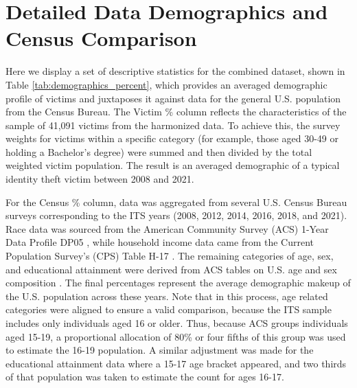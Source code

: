 \clearpage
\appendix




\section{Detailed Data Demographics and Census Comparison}
\label{app:demographics_census}

Here we display a set of descriptive statistics for the combined dataset,  shown in Table \ref{tab:demographics_percent}, which provides an averaged demographic profile of victims and juxtaposes it against data for the general U.S. population from the Census Bureau. The Victim \% column reflects the characteristics of the sample of 41,091 victims from the harmonized data. To achieve this, the survey weights for victims within a specific category (for example, those aged 30-49 or holding a Bachelor's degree) were summed and then divided by the total weighted victim population. The result is an averaged demographic of a typical identity theft victim between 2008 and 2021. 

For the Census \% column, data was aggregated from several U.S. Census Bureau surveys corresponding to the ITS years (2008, 2012, 2014, 2016, 2018, and 2021). Race data was sourced from the American Community Survey (ACS) 1-Year Data Profile DP05 \cite{Census_ACS_DP05}, while household income data came from the Current Population Survey's (CPS) Table H-17 \cite{Census_CPS_H17}. The remaining categories of age, sex, and educational attainment were derived from ACS tables on U.S. age and sex composition \cite{Census_AgeSex}. The final percentages represent the average demographic makeup of the U.S. population across these years. Note that in this process, age related categories were aligned to ensure a valid comparison, because the ITS sample includes only individuals aged 16 or older. Thus, because ACS groups individuals aged 15-19, a proportional allocation of 80\% or four fifths of this group was used to estimate the 16-19 population. A similar adjustment was made for the educational attainment data where a 15-17 age bracket appeared, and two thirds of that population was taken to estimate the count for ages 16-17. 

